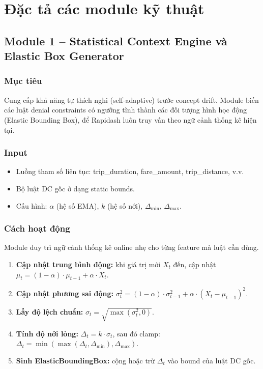 \chapter{Đặc tả các module kỹ thuật}

\section{Module 1 -- Statistical Context Engine và Elastic Box Generator}

\subsection{Mục tiêu}
Cung cấp khả năng tự thích nghi (self-adaptive) trước concept drift. Module biến các luật denial constraints có ngưỡng tĩnh thành các đối tượng hình học động (Elastic Bounding Box), để Rapidash luôn truy vấn theo ngữ cảnh thống kê hiện tại.

\subsection{Input}
\begin{itemize}
  \item Luồng tham số liên tục: trip\_duration, fare\_amount, trip\_distance, v.v.
  \item Bộ luật DC gốc ở dạng static bounds.
  \item Cấu hình: $\alpha$ (hệ số EMA), $k$ (hệ số nới), $\Delta_{\min}$, $\Delta_{\max}$.
\end{itemize}

\subsection{Cách hoạt động}
Module duy trì ngữ cảnh thống kê online nhẹ cho từng feature mà luật cần dùng.

\begin{enumerate}
  \item \textbf{Cập nhật trung bình động:} khi giá trị mới $X_t$ đến, cập nhật $\mu_t = (1-\alpha) \cdot \mu_{t-1} + \alpha \cdot X_t$.
  \item \textbf{Cập nhật phương sai động:} $\sigma_t^2 = (1-\alpha) \cdot \sigma_{t-1}^2 + \alpha \cdot (X_t - \mu_{t-1})^2$.
  \item \textbf{Lấy độ lệch chuẩn:} $\sigma_t = \sqrt{\max(\sigma_t^2, 0)}$.
  \item \textbf{Tính độ nới lỏng:} $\Delta_t = k \cdot \sigma_t$, sau đó clamp: $\Delta_t = \min(\max(\Delta_t, \Delta_{\min}), \Delta_{\max})$.
  \item \textbf{Sinh ElasticBoundingBox:} cộng hoặc trừ $\Delta_t$ vào bound của luật DC gốc.
\end{enumerate}

